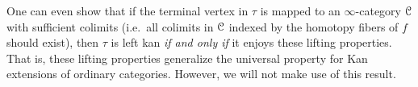 \documentclass[main.tex]{subfiles}
\begin{document}
\begin{note}
  One can even show that if the terminal vertex in $\tau$ is mapped to an $\infty$-category $\mathcal{C}$ with sufficient colimits (i.e.\ all colimits in $\mathcal{C}$ indexed by the homotopy fibers of $f$ should exist), then $\tau$ is left kan \emph{if and only if} it enjoys these lifting properties. That is, these lifting properties generalize the universal property for Kan extensions of ordinary categories. However, we will not make use of this result.
\end{note}

\end{document}
